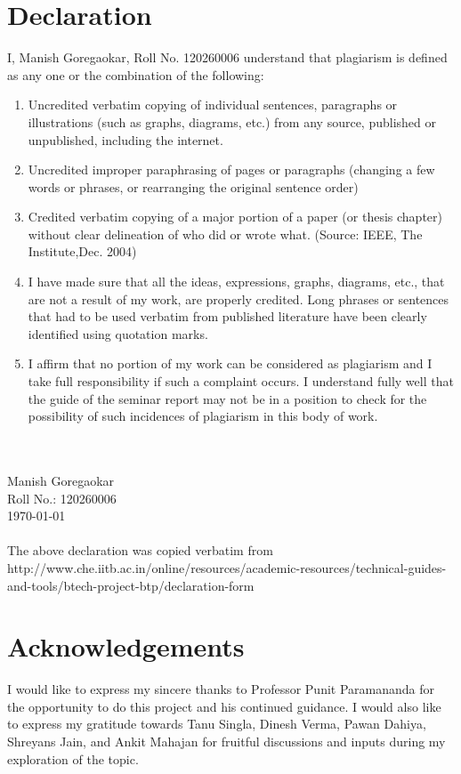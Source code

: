 \documentclass[12pt]{article}
\begin{document}
\section*{Declaration}
 I, Manish Goregaokar, Roll No. 120260006 understand that plagiarism is defined as any one or the combination of the following:
\begin{enumerate}
\item Uncredited verbatim copying of individual sentences, paragraphs or illustrations (such as graphs, diagrams, etc.) from any source, published or unpublished, including the internet.
\item Uncredited improper paraphrasing of pages or paragraphs (changing a few words or phrases, or rearranging the original sentence order)
\item  Credited verbatim copying of a major portion of a paper (or thesis chapter) without clear delineation of who did or wrote what. (Source: IEEE, The Institute,Dec. 2004)
\item I have made sure that all the ideas, expressions, graphs, diagrams, etc., that are not a result of my work, are properly credited. Long phrases or sentences that had to be used verbatim from published literature have been clearly identified using quotation marks.
\item I affirm that no portion of my work can be considered as plagiarism and I take full responsibility if such a complaint occurs. I understand fully well that the guide of the seminar report may not be in a position to check for the possibility of such incidences of plagiarism in this body of work.
\end{enumerate}
\quad
\\\quad
\\Manish Goregaokar
\\Roll No.: 120260006
\\\today\\
\quad\\
{\tiny The above declaration was copied verbatim from http://www.che.iitb.ac.in/online/resources/academic-resources/technical-guides-and-tools/btech-project-btp/declaration-form}
\pagebreak
{}
\section*{Acknowledgements}
I would like to express my sincere thanks to Professor Punit Paramananda for the opportunity to do this project and his continued guidance. I would also like to express my gratitude towards Tanu Singla, Dinesh Verma, Pawan Dahiya, Shreyans Jain, and Ankit Mahajan for fruitful discussions and inputs during my exploration of the topic.
\pagebreak
{}
\end{document}

